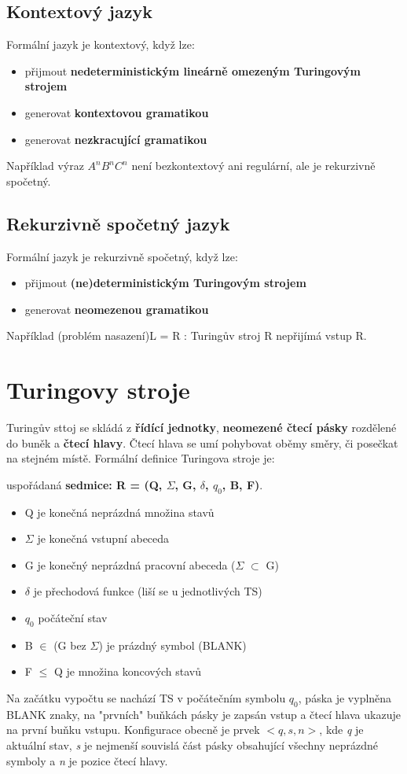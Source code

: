 \documentclass{szzclass}
\begin{document}
\subsection{Kontextový jazyk}
Formální jazyk je kontextový, když lze:
\begin{itemize}
\item přijmout \textbf{nedeterministickým lineárně omezeným Turingovým strojem}
\item generovat \textbf{kontextovou gramatikou}
\item generovat \textbf{nezkracující gramatikou}
\end{itemize}
Například výraz $A^nB^nC^n$ není bezkontextový ani regulární, ale je rekurzivně spočetný.

\subsection{Rekurzivně spočetný jazyk}
Formální jazyk je rekurzivně spočetný, když lze:
\begin{itemize}
\item přijmout \textbf{(ne)deterministickým Turingovým strojem}
\item generovat \textbf{neomezenou gramatikou}
\end{itemize}
Například (problém nasazení)L = {R : Turingův stroj R nepřijímá vstup R}.

\section{Turingovy stroje}
Turingův sttoj se skládá z \textbf{řídící jednotky}, \textbf{neomezené čtecí pásky} rozdělené do buněk a \textbf{čtecí hlavy}.
Čtecí hlava se umí pohybovat oběmy směry, či posečkat na stejném místě.
\newline
Formální definice Turingova stroje je:

uspořádaná \textbf{sedmice: R = (Q, $\Sigma$, G, $\delta$, $q_0$, B, F)}.
\begin{itemize}
\item Q je konečná neprázdná množina stavů
\item $\Sigma$ je konečná vstupní abeceda
\item G je konečný neprázdná pracovní abeceda ($\Sigma$ $\subset$ G)
\item $\delta$ je přechodová funkce (liší se u jednotlivých TS)
\item $q_0$ počáteční stav
\item B $\in$ (G bez $\Sigma$) je prázdný symbol (BLANK)
\item F $\leq$ Q je množina koncových stavů
\end{itemize}
Na začátku vypočtu se nachází TS v počátečním symbolu $q_0$, páska je vyplněna BLANK znaky, na "prvních" buňkách pásky je zapsán vstup a čtecí hlava ukazuje na první buňku vstupu.
\newline
Konfigurace obecně je prvek $<q,s,n>$, kde \textit{q} je aktuální stav, \textit{s} je nejmenší souvislá část pásky obsahující všechny neprázdné symboly a \textit{n} je pozice čtecí hlavy.
\end{document}
